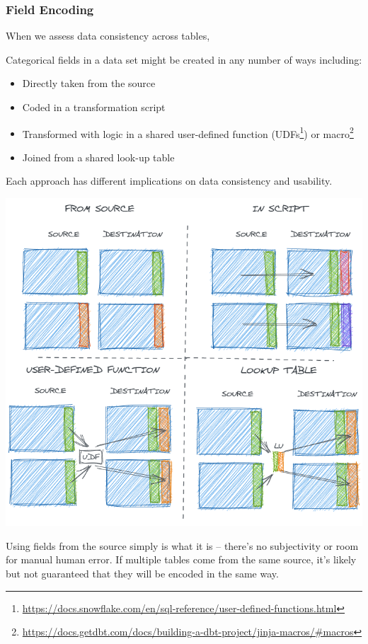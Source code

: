 \documentclass[
]{krantz}
\providecommand{\tightlist}{%
  \setlength{\itemsep}{0pt}\setlength{\parskip}{0pt}}
\renewcommand{\href}[2]{#2\footnote{\url{#1}}}
\begin{document}
\hypertarget{field-encoding}{%
\subsubsection{Field Encoding}\label{field-encoding}}

When we assess data consistency across tables,

Categorical fields in a data set might be created in any number of ways including:

\begin{itemize}
\tightlist
\item
  Directly taken from the source
\item
  Coded in a transformation script
\item
  Transformed with logic in a shared user-defined function (\href{https://docs.snowflake.com/en/sql-reference/user-defined-functions.html}{UDFs}) or \href{https://docs.getdbt.com/docs/building-a-dbt-project/jinja-macros/\#macros}{macro}
\item
  Joined from a shared look-up table
\end{itemize}

Each approach has different implications on data consistency and usability.

\begin{center}\includegraphics[width=0.9\linewidth]{figures/data-dall/field-encoding} \end{center}

Using fields from the source simply is what it is -- there's no subjectivity or room for manual human error. If multiple tables come from the same source, it's likely but not guaranteed that they will be encoded in the same way.
\end{document}

